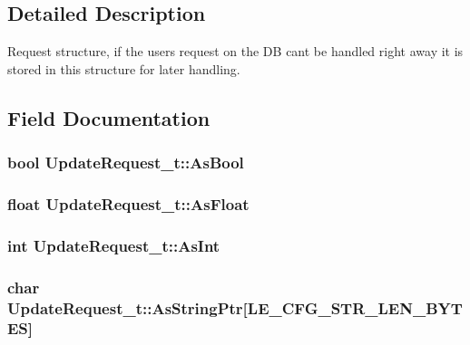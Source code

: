 \subsection{Detailed Description}
Request structure, if the user\textquotesingle{}s request on the DB can\textquotesingle{}t be handled right away it is stored in this structure for later handling. 

\subsection{Field Documentation}
\subsubsection[{\texorpdfstring{As\+Bool}{AsBool}}]{\setlength{\rightskip}{0pt plus 5cm}bool Update\+Request\+\_\+t\+::\+As\+Bool}\hypertarget{struct_update_request__t_a955b1fec93f6f5ebbf79ec4b54f0a59c}{}\label{struct_update_request__t_a955b1fec93f6f5ebbf79ec4b54f0a59c}
\subsubsection[{\texorpdfstring{As\+Float}{AsFloat}}]{\setlength{\rightskip}{0pt plus 5cm}float Update\+Request\+\_\+t\+::\+As\+Float}\hypertarget{struct_update_request__t_aa2096bedb70242699586abb7e8e71a20}{}\label{struct_update_request__t_aa2096bedb70242699586abb7e8e71a20}
\subsubsection[{\texorpdfstring{As\+Int}{AsInt}}]{\setlength{\rightskip}{0pt plus 5cm}int Update\+Request\+\_\+t\+::\+As\+Int}\hypertarget{struct_update_request__t_adb1133dfc14bf4aec2a50a8b842d0cbe}{}\label{struct_update_request__t_adb1133dfc14bf4aec2a50a8b842d0cbe}
\subsubsection[{\texorpdfstring{As\+String\+Ptr}{AsStringPtr}}]{\setlength{\rightskip}{0pt plus 5cm}char Update\+Request\+\_\+t\+::\+As\+String\+Ptr\mbox{[}{\bf L\+E\+\_\+\+C\+F\+G\+\_\+\+S\+T\+R\+\_\+\+L\+E\+N\+\_\+\+B\+Y\+T\+ES}\mbox{]}}\hypertarget{struct_update_request__t_ae2b7f457e51e3b9f05cba1f13c19222e}{}\label{struct_update_request__t_ae2b7f457e51e3b9f05cba1f13c19222e}
